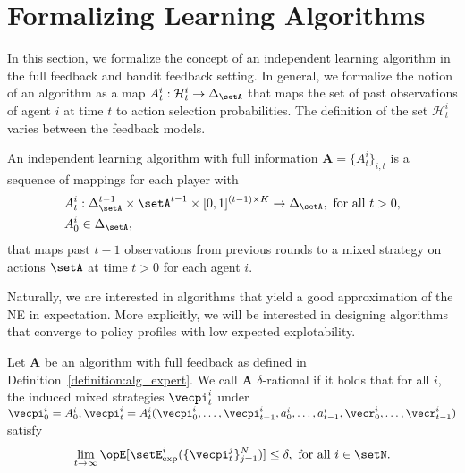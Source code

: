 \section{Formalizing Learning Algorithms}\label{section:alg_formalization}

In this section, we formalize the concept of an independent learning algorithm in the full feedback and bandit feedback setting.
In general, we formalize the notion of an algorithm as a map $A_t^i: \mathcal{H}_{t}^i \rightarrow \Delta_\setA$ that maps the set of past observations of agent $i$ at time $t$ to action selection probabilities.
The definition of the set $\mathcal{H}_{t}^i$ varies between the feedback models.

\begin{definition}
\label{definition:alg_expert}
An independent learning algorithm with full information $\mathbf{A} = \{ A_t^i\}_{i,t}$ is a sequence of mappings for each player with
\begin{align*}
    &A_t^i : \Delta_\setA^{t-1} \times \setA^{t-1} \times [0,1]^{(t-1) \times K} \rightarrow \Delta_\setA, \text{ for all $t > 0$}, \\
    &A_0^i \in \Delta_\setA,
\end{align*}
that maps past $t-1$ observations from previous rounds to a mixed strategy on actions $\setA$ at time $t > 0$ for each agent $i$.
\end{definition}

Naturally, we are interested in algorithms that yield a good approximation of the NE in expectation.
More explicitly, we will be interested in designing algorithms that converge to policy profiles with low expected explotability.

\begin{definition}
Let $\mathbf{A}$ be an algorithm with full feedback as defined in Definition~\ref{definition:alg_expert}.
We call $\mathbf{A}$ $\delta$-rational if it holds that for all $i$, the induced mixed strategies $\vecpi_t^i$ under $\vecpi_0^i = A_0^i, \vecpi_t^i = A_t^i(\vecpi^i_0, \ldots, \vecpi_{t-1}^i, a_0^i, \ldots, a_{t-1}^i, \vecr_{0}^i, \ldots, \vecr_{t-1}^i)$ satisfy
\begin{align*}
    \lim_{t\rightarrow \infty} \Exop[ \setE^i_{\text{exp}}(\{\vecpi_t^j \}_{j=1}^N)] \leq \delta, \text{ for all } i \in \setN.
\end{align*}
\end{definition}

